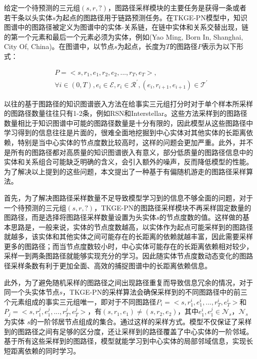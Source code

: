 给定一个待预测的三元组$(s,r,?)$，图路径采样模块的主要任务是获得一条或者若干条以头实体$s$为起点的图路径用于链路预测任务。在TKGE-PN模型中，知识图谱中的图路径被定义为图谱中的实体-关系链，在链中实体和关系交替出现，链的第一个元素和最后一个元素必须为实体，例如(Yao Ming, Born In, Shanghai, City Of, China)。在图谱中，以节点$s$为起点，长度为$T$的图路径$P$表示为以下形式：

\begin{equation}
  \begin{aligned}
     &P=<s,r_1,e_1,r_2,e_2,...,r_T,e_T>, \\
     &{\forall}i \in (0,T),e_i\in\mathcal{E},r_i\in\mathcal{R}^{\prime},(e_i,r_{i+1},e_{i+1})\in\mathcal{T}^{\prime}
  \end{aligned}
\end{equation}

以往的基于图路径的知识图谱嵌入方法在给事实三元组打分时对于单个样本所采样的图路径数量往往只有1-2条，例如RSN和Interstellar。这些方法采样到的图路径数量相比于知识图谱中可能的图路径数量是十分有限的，因此模型从这些图路径中学习得到的信息往往是片面的，很难全面地挖掘到中心实体对其他实体的长距离依赖，特别是当中心实体的节点度数比较高时，这样的问题会更加严重。此外，并不是所有的图路径都对高质量的知识图谱嵌入有意义，部分低质量的图路径信息中的实体和关系组合可能缺乏明确的含义，会引入额外的噪声，反而降低模型的性能。为了解决以上提到的这些问题，本文提出了一种基于有偏随机游走的图路径采样算法。

首先，为了解决图路径采样数量不足导致模型学习到的信息不够全面的问题，对于一个待预测的三元组$(s,r,?)$，TKGE-PN的图路径采样模块不再采样固定数量的图路径，而是选择将图路径采样数量设置为头实体$s$的节点度数的值。这样做的基本思路是，一般来说，实体的节点度数越高，以实体作为起点可能采样到的图路径就越多，该实体和其他实体之间可能存在的长距离的依赖就越丰富，因此需要采样更多的图路径；而当节点度数较小时，中心实体可能存在的长距离依赖相对较少，采样一到两条图路径就能够实现充分的学习。因此随实体节点度数动态变化的图路径采样条数有利于更加全面、高效的捕捉图谱中的长距离依赖信息。

此外，为了避免随机采样的图路径之间出现路径重复而导致信息冗余的情况，对于同一个头实体节点$s$，TKGE-PN的采样算法会确保采样到的不同图路径中的前三个元素组成的事实三元组唯一，即对于不同图路径$P_i=<s,r_1^{i},e_1^{i},...,r_T^{i},e_T^{i}>$和$P_j=<s,r_1^{j},e_1^{j},...,r_T^{j},e_T^{j}>$，有$(s, r_1, e_1)\neq(s, r_2, e_2)$，其中$e_1^{i},e_1^{j}\in \mathcal{N}_s$，$\mathcal{N}_s$为实体 $s$的一阶邻居节点组成的集合。通过这样的采样方式。模型不仅保证了采样到的图路径之间有足够的区分度，还让采样到的路径覆盖了中心实体的一阶邻域。基于所有这些采样到的图路径，模型就能学习到中心实体的局部邻域信息，实现长短距离依赖的同时学习。

